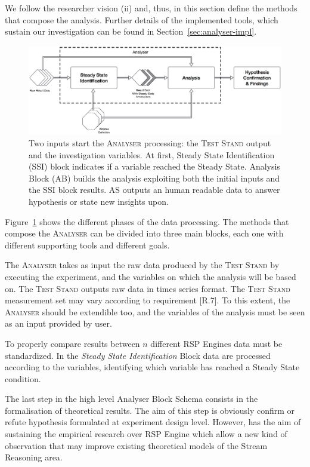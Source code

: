 We follow the researcher vision (ii) and, thus, in this section define the methods that compose the analysis. Further details of the implemented tools, which sustain our investigation can be found in Section~\ref{sec:analyser-impl}.

\begin{figure}[tbh]
  \centering
	\includegraphics[width=\linewidth]{images/analyser-block-schema}
	\caption[\textsc{Analyser} Block Schema - Design Detail Level]{Two inputs start the \textsc{Analyser} processing: the \textsc{Test Stand} output and the investigation variables. At first, Steady State Identification (SSI) block indicates if a variable reached the Steady State. Analysis Block (AB) builds the analysis exploiting both the initial inputs and the SSI block results. AS outputs an human readable data to answer hypothesis or state new insights upon.}
  	\label{fig:analyser-block-schema}
\end{figure}

Figure~\ref{fig:analyser-block-schema} shows the different phases of the data processing. The methods that compose the \textsc{Analyser} can be divided into three main blocks, each one with different supporting tools and different goals.

The \textsc{Analyser} takes as input the raw data produced by the \textsc{Test Stand} by executing the experiment, and the variables on which the analysis will be based on. The \textsc{Test Stand} outputs raw data in times series format. The \textsc{Test Stand} measurement set may vary according to requirement [R.7]. To this extent, the \textsc{Analyser} should be extendible too, and the variables of the analysis must be seen as an input provided by \name user.

To properly compare results between $n$ different RSP Engines data must be standardized. In the \textit{Steady State Identification} Block data are processed according to the variables, identifying which variable has reached a Steady State condition.

The last step in the high level Analyser Block Schema consists in the formalisation of theoretical results. The aim of this step is obviously confirm or refute hypothesis formulated at experiment design level. However, \name has the aim of sustaining the empirical research over RSP Engine which allow a new kind of observation that may improve existing theoretical models of the Stream Reasoning area.

